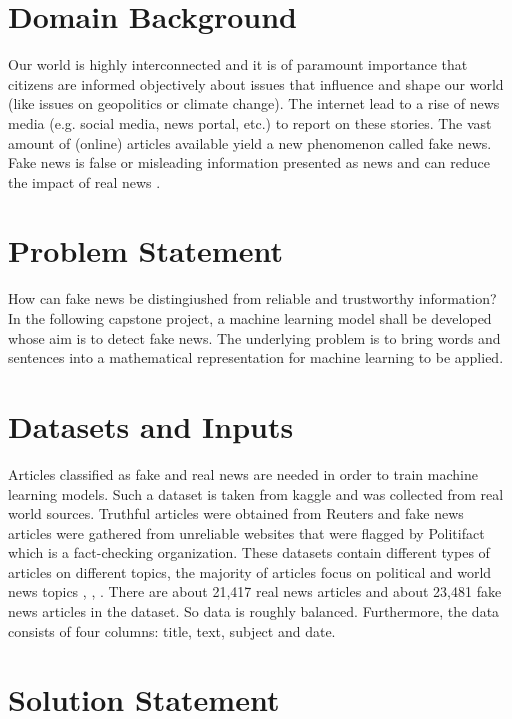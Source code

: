 \documentclass[a4paper,12pt,nottoc]{article}
\begin{document}
\section*{Domain Background}

Our world is highly interconnected and it is of paramount importance that citizens are informed objectively about issues that influence and shape our world (like issues on geopolitics or climate change). The internet lead to a rise of news media (e.g. social media, news portal, etc.) to report on these stories. The vast amount of (online) articles available yield a new phenomenon called fake news. Fake news is false or misleading information presented as news and can reduce the impact of real news \cite{bib:fakenews}.

\section*{Problem Statement}

How can fake news be distingiushed from reliable and trustworthy information? In the following capstone project, a machine learning model shall be developed whose aim is to detect fake news. The underlying problem is to bring words and sentences into a mathematical representation for machine learning to be applied.

\section*{Datasets and Inputs}

Articles classified as fake and real news are needed in order to train machine learning models. Such a dataset is taken from kaggle \cite{bib:kaggle} and was collected from real world sources. Truthful articles were obtained from Reuters and fake news articles were gathered from unreliable websites that were flagged by Politifact which is a fact-checking organization. These datasets contain different types of articles on different topics, the majority of articles focus on political and world news topics \cite{bib:isot}, \cite{bib:ahmed-2018}, \cite{bib:ahmed-2017}. There are about 21,417 real news articles and about 23,481 fake news articles in the dataset. So data is roughly balanced. Furthermore, the data consists of four columns: title, text, subject and date.

\section*{Solution Statement}
\end{document}
